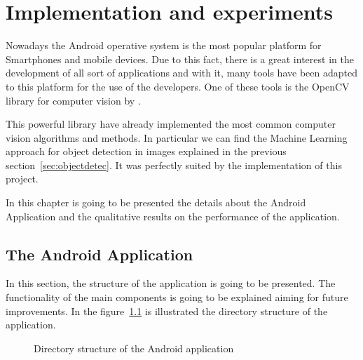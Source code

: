 \chapter{Implementation and experiments}  
\label{cha:android}

Nowadays the Android operative system is the most popular platform for
Smartphones and mobile devices. Due to this fact, there is a great interest in
the development of all sort of applications and with it, many tools have
been adapted to this platform for the use of the developers. One of these tools
is the OpenCV library for computer vision by \cite{opencv}.

This powerful library have already implemented the most common computer vision
algorithms and methods. In particular we can find the Machine Learning approach
for object detection in images explained in the previous
section~\ref{sec:objectdetec}.  It was perfectly suited by the implementation of this
project.

In this chapter is going to be presented the details about the Android
Application and the qualitative results on the performance of the application.

\section{The Android Application} %
\label{sec:androidapp}

In this section, the structure of the application is going to be presented. The
functionality of the main components is going to be explained aiming for future
improvements. In the figure~\ref{fig:andrivedir} is illustrated the directory
structure of the application.

\begin{figure}
    \centering\small
    \begin{minipage}[t]{0.6\linewidth}
    \end{minipage}
\caption{Directory structure of the Android application}
\label{fig:andrivedir}
\end{figure}

